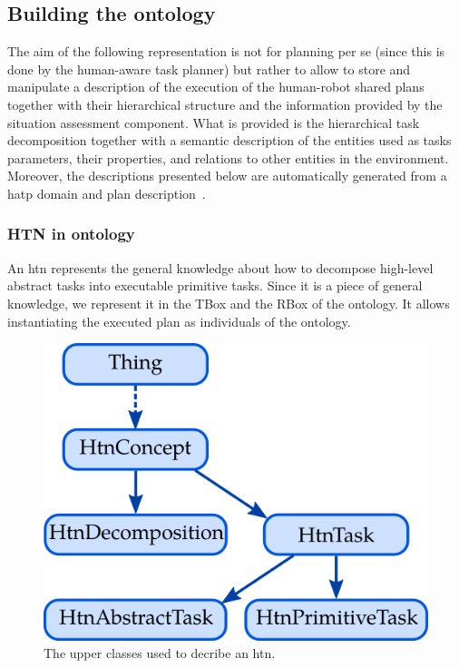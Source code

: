 \subsection{Building the ontology}

The aim of the following representation is not for planning per se (since this is done by the human-aware task planner) but rather to allow to store and manipulate a description of the execution of the human-robot shared plans together with their hierarchical structure and the information provided by the situation assessment component.
What is provided is the hierarchical task decomposition together with a semantic description of the entities used as tasks parameters, their properties, and relations to other entities in the environment. Moreover, the descriptions presented below are automatically generated from a \acrshort{hatp} domain and plan description~\cite{lallement_2014_hatp}.

\subsubsection{HTN in ontology}

An \acrshort{htn} represents the general knowledge about how to decompose high-level abstract tasks into executable primitive tasks. Since it is a piece of general knowledge, we represent it in the TBox and the RBox of the ontology. It allows instantiating the executed plan as individuals of the ontology.

\begin{figure}[h!]
\centering
\includegraphics[scale=0.4]{figures/chapter6/tbox_base.png}
\caption{\label{fig:chap6_tbox_base} The upper classes used to decribe an \acrshort{htn}.}
\end{figure}

